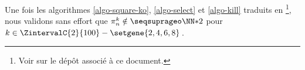 \leavevmode
\smallskip

Une fois les algorithmes \ref{algo-square-ko}, \ref{algo-select} et \ref{algo-kill} traduits en \python
\footnote{
	Voir sur le dépôt associé à ce document.
},
nous validons sans effort que $\consprod \notin \NNssquare$ pour $k \in \ZintervalC{2}{100} - \setgene{2, 4, 6, 8}$\,.
